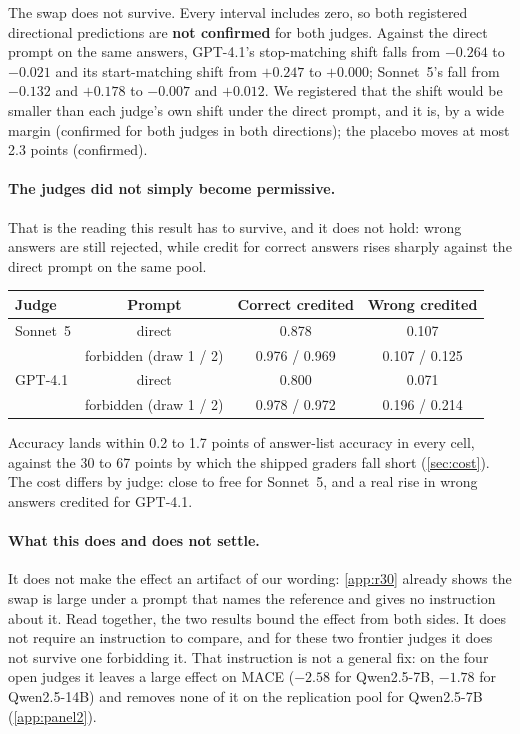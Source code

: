 \noindent The swap does not survive. Every interval includes zero, so both registered directional predictions
are \textbf{not confirmed} for both judges. Against the direct prompt on the same answers, GPT-4.1's
stop-matching shift falls from $-0.264$ to $-0.021$ and its start-matching shift from $+0.247$ to $+0.000$;
Sonnet~5's fall from $-0.132$ and $+0.178$ to $-0.007$ and $+0.012$. We registered that the shift would be
smaller than each judge's own shift under the direct prompt, and it is, by a wide margin (confirmed for both
judges in both directions); the placebo moves at most 2.3 points (confirmed).

\paragraph{The judges did not simply become permissive.} That is the reading this result has to survive, and
it does not hold: wrong answers are still rejected, while credit for correct answers rises sharply against
the direct prompt on the same pool.

\begin{center}\footnotesize
\begin{tabular}{lccc}
\toprule
Judge & Prompt & Correct credited & Wrong credited \\
\midrule
Sonnet~5 & direct & 0.878 & 0.107 \\
 & forbidden (draw 1 / 2) & 0.976 / 0.969 & 0.107 / 0.125 \\
\addlinespace[2pt]
GPT-4.1 & direct & 0.800 & 0.071 \\
 & forbidden (draw 1 / 2) & 0.978 / 0.972 & 0.196 / 0.214 \\
\bottomrule
\end{tabular}
\end{center}

\noindent Accuracy lands within 0.2 to 1.7 points of answer-list accuracy in every cell, against the 30 to 67
points by which the shipped graders fall short (\cref{sec:cost}). The cost differs by judge: close to free
for Sonnet~5, and a real rise in wrong answers credited for GPT-4.1.

\paragraph{What this does and does not settle.} It does not make the effect an artifact of our wording:
\cref{app:r30} already shows the swap is large under a prompt that names the reference and gives no
instruction about it. Read together, the two results bound the effect from both sides. It does not require an
instruction to compare, and for these two frontier judges it does not survive one forbidding it.
That instruction is not a general fix: on the four open judges it leaves a large effect on \textsc{MACE} ($-2.58$ for Qwen2.5-7B, $-1.78$ for Qwen2.5-14B) and removes none of it on the replication pool for Qwen2.5-7B (\cref{app:panel2}).

